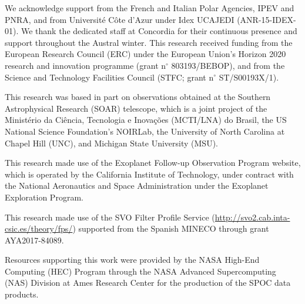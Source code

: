 \documentclass[12pt,twocolumn,tighten]{aastex63}
\begin{document}
We acknowledge support from the French and Italian Polar Agencies,
IPEV and PNRA, and from Universit\'e C\^ote d’Azur under Idex UCAJEDI
(ANR-15-IDEX-01). We thank the dedicated staff at Concordia for their
continuous presence and support throughout the Austral winter.
%
This research received funding from the European Research Council
(ERC) under the European Union's Horizon 2020 research and innovation
programme (grant n$^\circ$ 803193/BEBOP), and from the
Science and Technology Facilities Council (STFC; grant n$^\circ$
ST/S00193X/1).
%
%

This research was based in part on observations obtained at the
Southern Astrophysical Research (SOAR) telescope, which is a joint
project of the Minist\'{e}rio da Ci\^{e}ncia, Tecnologia e
Inova\c{c}\~{o}es (MCTI/LNA) do Brasil, the US National Science
Foundation’s NOIRLab, the University of North Carolina at Chapel Hill
(UNC), and Michigan State University (MSU).

This research made use of the Exoplanet Follow-up Observation
Program website, which is operated by the California Institute of
Technology, under contract with the National Aeronautics and Space
Administration under the Exoplanet Exploration Program.

This research made use of the SVO Filter Profile Service
(\url{http://svo2.cab.inta-csic.es/theory/fps/}) supported from the Spanish
MINECO through grant AYA2017-84089.

Resources supporting this work were provided by the NASA High-End
Computing (HEC) Program through the NASA Advanced Supercomputing (NAS)
Division at Ames Research Center for the production of the SPOC data
products.
%
\end{document}
